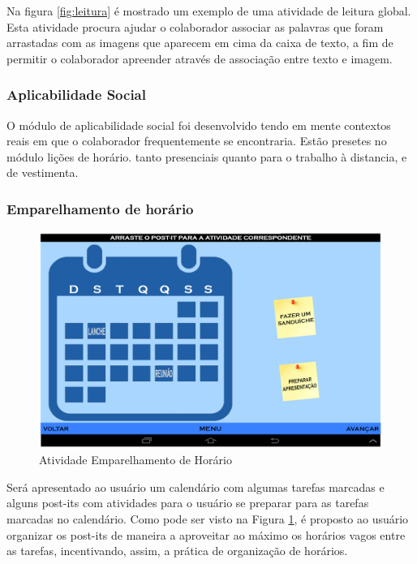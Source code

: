 \documentclass[12pt]{article}
\begin{document}
Na figura \ref{fig:leitura} é mostrado um exemplo de uma atividade de leitura global. Esta atividade procura ajudar o colaborador associar as palavras que foram arrastadas com as imagens que aparecem em cima da caixa de texto, a fim de permitir o colaborador apreender através de associação entre texto e imagem.

\subsubsection{Aplicabilidade Social}
O módulo de aplicabilidade social foi desenvolvido tendo em mente contextos reais em que o colaborador frequentemente se encontraria. Estão presetes no módulo lições de horário. tanto presenciais quanto para o trabalho à distancia, e de vestimenta. 

\subsubsection{Emparelhamento de horário}

 \begin{figure}[h!]
    \centering
    \includegraphics[width=1.0\textwidth]{emparelhamento_horarios.png}
    \caption{ Atividade Emparelhamento de Horário }
    \label{fig:emparelha_horario}
\end{figure}

Será apresentado ao usuário um calendário com algumas tarefas marcadas e alguns post-its com atividades para o usuário se preparar para as tarefas marcadas no calendário. Como pode ser visto na Figura \ref{fig:emparelha_horario}, é proposto ao usuário organizar os post-its de maneira a aproveitar ao máximo os horários vagos entre as tarefas, incentivando, assim, a prática de organização de horários.
\end{document}

